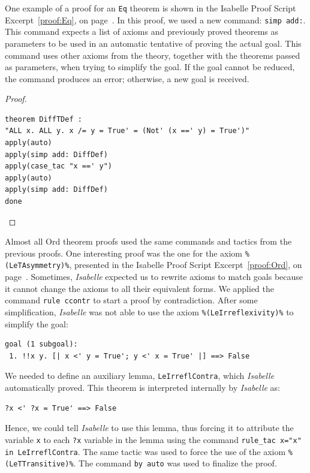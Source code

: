 \documentclass[12pt,twoside]{article}
\numberwithin{spec}{subsection}
\numberwithin{proof}{subsection}
\numberwithin{figure}{subsection}
\numberwithin{code}{subsection}
\newcommand{\citeProof}[1]{Isabelle Proof Script Excerpt~\ref{#1}, on page~\pageref{#1}}
\newcommand{\axiom}[1]{{\tt \%(#1)\%}}
\begin{document}
One example of a proof for an \verb.Eq. theorem is shown in the \citeProof{proof:Eq}. In this proof, we used a new command: \verb.simp add:.. This command expects a list of axioms and previously proved theorems as parameters to be used in an automatic tentative of proving the actual goal. This command uses other axioms from the theory, together with the theorems passed as parameters, when trying to simplify the goal. If the goal cannot be reduced, the command produces an error; otherwise, a new goal is received.

\begin{proof}
\begin{verbatim}
theorem DiffTDef :
"ALL x. ALL y. x /= y = True' = (Not' (x ==' y) = True')"
apply(auto)
apply(simp add: DiffDef)
apply(case_tac "x ==' y")
apply(auto)
apply(simp add: DiffDef)
done
\end{verbatim}
\caption{Equality proof}
\label{proof:Eq}
\end{proof}

Almost all Ord theorem proofs used the same commands and tactics from the previous proofs. One interesting proof was the one for the axiom \axiom{LeTAsymmetry}, presented in the \citeProof{proof:Ord}. Sometimes, \textit{Isabelle} expected us to rewrite axioms to match goals because it cannot change the axioms to all their equivalent forms. We applied the command \verb.rule ccontr. to start a proof by contradiction. After some simplification, \textit{Isabelle} was not able to use the axiom \axiom{LeIrreflexivity} to simplify the goal:

\begin{verbatim}
goal (1 subgoal):
 1. !!x y. [| x <' y = True'; y <' x = True' |] ==> False
\end{verbatim}

We needed to define an auxiliary lemma, \verb.LeIrreflContra., which \textit{Isabelle} automatically proved. This theorem is interpreted internally by \textit{Isabelle} as:

\begin{verbatim}
?x <' ?x = True' ==> False
\end{verbatim}

Hence, we could tell \textit{Isabelle} to use this lemma, thus forcing it to attribute the variable \verb.x. to each \verb.?x. variable in the lemma using the command \verb.rule_tac x="x". \verb.in LeIrreflContra.. The same tactic was used to force the use of the axiom \axiom{LeTTransitive}. The command \verb.by auto. was used to finalize the proof.
\end{document}

